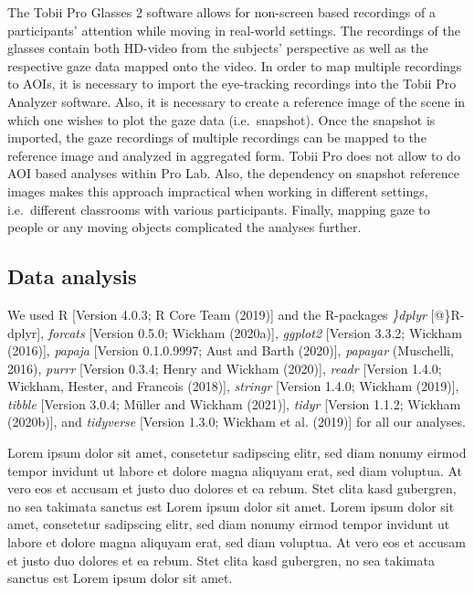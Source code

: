 \documentclass[
  english,
  man,floatsintext]{apa6}
\begin{document}
The Tobii Pro Glasses 2 software allows for non-screen based recordings of a participants' attention while moving in real-world settings. The recordings of the glasses contain both HD-video from the subjects' perspective as well as the respective gaze data mapped onto the video. In order to map multiple recordings to AOIs, it is necessary to import the eye-tracking recordings into the Tobii Pro Analyzer software. Also, it is necessary to create a reference image of the scene in which one wishes to plot the gaze data (i.e.~snapshot). Once the snapshot is imported, the gaze recordings of multiple recordings can be mapped to the reference image and analyzed in aggregated form. Tobii Pro does not allow to do AOI based analyses within Pro Lab. Also, the dependency on snapshot reference images makes this approach impractical when working in different settings, i.e.~different classrooms with various participants. Finally, mapping gaze to people or any moving objects complicated the analyses further.

\hypertarget{data-analysis}{%
\subsection{Data analysis}\label{data-analysis}}

We used R {[}Version 4.0.3; R Core Team (2019){]} and the R-packages \emph{\}dplyr} {[}@\}R-dplyr{]}, \emph{forcats} {[}Version 0.5.0; Wickham (2020a){]}, \emph{ggplot2} {[}Version 3.3.2; Wickham (2016){]}, \emph{papaja} {[}Version 0.1.0.9997; Aust and Barth (2020){]}, \emph{papayar} (Muschelli, 2016), \emph{purrr} {[}Version 0.3.4; Henry and Wickham (2020){]}, \emph{readr} {[}Version 1.4.0; Wickham, Hester, and Francois (2018){]}, \emph{stringr} {[}Version 1.4.0; Wickham (2019){]}, \emph{tibble} {[}Version 3.0.4; Müller and Wickham (2021){]}, \emph{tidyr} {[}Version 1.1.2; Wickham (2020b){]}, and \emph{tidyverse} {[}Version 1.3.0; Wickham et al. (2019){]} for all our analyses.

Lorem ipsum dolor sit amet, consetetur sadipscing elitr, sed diam nonumy eirmod tempor invidunt ut labore et dolore magna aliquyam erat, sed diam voluptua. At vero eos et accusam et justo duo dolores et ea rebum. Stet clita kasd gubergren, no sea takimata sanctus est Lorem ipsum dolor sit amet. Lorem ipsum dolor sit amet, consetetur sadipscing elitr, sed diam nonumy eirmod tempor invidunt ut labore et dolore magna aliquyam erat, sed diam voluptua. At vero eos et accusam et justo duo dolores et ea rebum. Stet clita kasd gubergren, no sea takimata sanctus est Lorem ipsum dolor sit amet.
\end{document}
